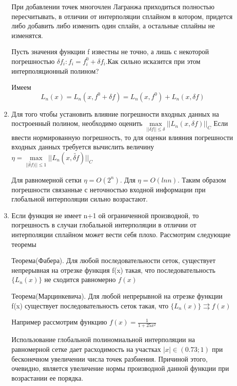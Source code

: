 \documentclass{article}
\begin{document}
\begin{enumerate}
\begin{enumerate}
	
            \noindent При добавлении точек многочлен Лагранжа приходиться полностью пересчитывать, в отличии от интерполяции сплайном в котором, придется либо добавить либо изменить один сплайн, а остальные сплайны не изменятся.
            
            
            \noindent Пусть значения функции f известны не точно, а лишь с некоторой погрешностью $\delta f_i: f_i= f_i^0+\delta f_i$.Как сильно исказится при этом интерполяционный полином?
            
            
            \noindent Имеем
            \[
            L_n(x) = L_n(x, f^0+\delta f) = L_n(x, f^0) + L_n(x, \delta f)
            \]
            \item Для того чтобы установить влияние погрешности входных данных на построенный полином, необходимо оценить $\max \limits_{||\delta f|| \le \delta} ||L_n(x, \delta f)||_C$
            Если ввести нормированную погрешность, то для оценки
            влияния погрешности входных данных требуется вычислить
            величину $\eta = \max \limits_{||\widetilde{\delta f})|| \le 1} ||L_n(x, \widetilde{\delta f})||_C$
            
            Для равномерной сетки $\eta=O(2^n)$. Для $\eta = O(lnn)$. Таким образом погрешности связанные с неточностью входной информации при глобальной интерполяции сильно возрастают. 
            \item  Если функция не имеет n+1 ой ограниченной производной, то погрешность в случаи глобальной интерполяции в отличии от интерполяции сплайном может вести себя плохо. Рассмотрим следующие теоремы 
	
	
            Теорема(Фабера). Для любой последовательности сеток, существует непрерывная на отрезке функция f(x) такая, что  последовательность $\{L_n(x)\}$ не сходится равномерно $f(x)$
            
            
            Теорема(Марцинкевича). Для любой непрерывной на отрезке функции f(x) существует последовательность сеток такая, что $\{L_n(x)\} \rightrightarrows f(x)$
            
            Например рассмотрим функцию $f(x) = \frac{1}{1+25x^2}$
            
            Использование глобальной полиномиальной интерполяции на
            равномерной сетке дает расходимость на участках $|x| \in (0.73;1)$ при бесконечном увеличении числа точек разбиения. Причиной этого, очевидно, является увеличение нормы производной данной функции при возрастании ее порядка.
            

\end{enumerate}
\end{enumerate}
\end{document}
